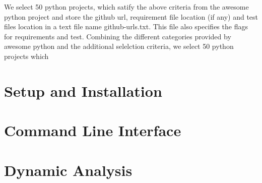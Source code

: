 We select 50 python projects, which satify the above criteria from the awesome python project and store the github url, requirement file location (if any) and test files location in a text file name github-urls.txt. This file also specifies the flags for requirements and test.
Combining the different categories provided by awesome python and the additional selelction criteria, we select 50 python projects which 

\section{Setup and Installation}
\label{impl:setup and installation}

\section{Command Line Interface}
\label{impl:command line interface}

\section{Dynamic Analysis}
\label{impl:dynamic analysis}

